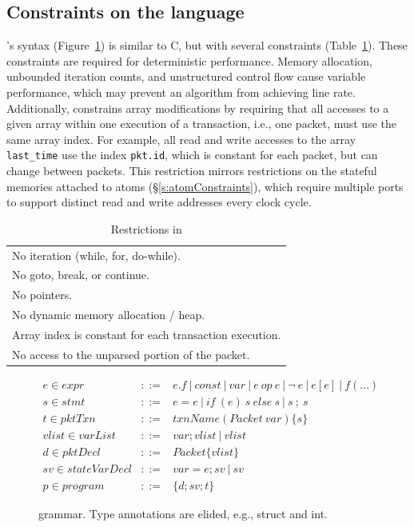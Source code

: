 \subsection{Constraints on the language}
\label{ss:constraints}
\pktlanguage's syntax (Figure~\ref{fig:grammar}) is similar to C, but with
several constraints (Table~\ref{tab:restrict}).  These constraints are required
for deterministic performance.  Memory allocation, unbounded iteration counts,
and unstructured control flow cause variable performance, which may prevent an
algorithm from achieving line rate.  Additionally, \pktlanguage constrains
array modifications by requiring that all accesses to a given array within one
execution of a transaction, i.e., one packet, must use the same array index.
For example, all read and write accesses to the array \texttt{last\_time} use
the index \texttt{pkt.id}, which is constant for each packet, but can change
between packets. This restriction mirrors restrictions on the stateful memories
attached to atoms (\S\ref{s:atomConstraints}), which require multiple ports to
support distinct read and write addresses every clock cycle.

\begin{table}
  \begin{tabular}{p{}}
    No iteration (while, for, do-while).\\
    No goto, break, or continue.\\
    No pointers.\\
    No dynamic memory allocation / heap.\\
    Array index is constant for each transaction execution.\\
    No access to the unparsed portion of the packet.\\
  \end{tabular}
  \caption{Restrictions in \pktlanguage}
  \label{tab:restrict}
\end{table}

\begin{figure}
\newcommand{\sep}{~|~}
\begin{scriptsize}
\begin{eqnarray*}
e \in expr &::=& e.f \sep const \sep var \sep e~op~e \sep \neg~e \sep e[e] \sep f(\ldots) \\
%
s \in stmt &::=& e = e \sep if~(e)~s~else~s \sep s~;~s \\
%
t \in pktTxn &::=& txnName(Packet~var) \{ s \} \\
%
vlist \in varList &::=& var;vlist \sep vlist \\
%
d \in pktDecl &::=& Packet \{ vlist \} \\
%
sv \in stateVarDecl &::=& var = e;sv \sep sv \\
%
p \in program &::=& \{ d ; sv ; t \}
\end{eqnarray*}
\end{scriptsize}
\caption{\pktlanguage grammar. Type annotations are elided, e.g., struct and int.}
\label{fig:grammar}
\end{figure}


